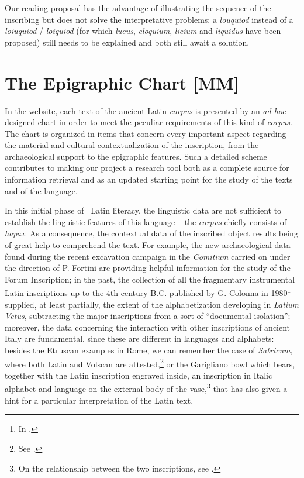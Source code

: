 \documentclass[amsthm,ebook]{saparticle}
\begin{document}
Our reading proposal has the advantage of illustrating the sequence of the inscribing but does not solve the
interpretative problems: a \emph{louquiod} instead of a \emph{loiuquiod} / \emph{loiquiod} (for which \emph{lucus}, \emph{eloquium}, \emph{licium} and \emph{liquidus}
have been proposed) still needs to be explained and both still await a solution. 

\section{The Epigraphic Chart [MM]}\label{sec:3chart}


\noindent In the website, each text of the ancient Latin \emph{corpus} is presented by an \emph{ad hoc} designed chart in order to meet the
peculiar requirements of this kind of \emph{corpus}. The chart is organized in items that concern every important aspect
regarding the material and cultural contextualization of the inscription, from the archaeological support to the
epigraphic features. Such a detailed scheme contributes to making our project a research tool both as a complete source
for information retrieval and as an updated starting point for the study of the texts and of the language.

In this initial phase of \ Latin literacy, the linguistic data are not sufficient to establish the linguistic features
of this language – the \emph{corpus} chiefly consists of \emph{hapax}. As a consequence, the contextual data of the inscribed object
results being of great help to comprehend the text. For example, the new archaeological data found during the recent
excavation campaign in the \emph{Comitium} carried on under the direction of P. Fortini are providing helpful information for
the study of the Forum Inscription; in the past, the collection of all the fragmentary instrumental Latin inscriptions
up to the 4th century B.C. published by G. Colonna in 1980\footnote{In \citet{stibbe_lapis_1980}.} supplied, at least
partially, the extent of the alphabetization developing in \emph{Latium Vetus}, subtracting the major inscriptions from a sort
of ``documental isolation''; moreover, the data concerning the interaction with other inscriptions of ancient Italy are
fundamental, since these are different in languages and alphabets: besides the Etruscan examples in Rome, we can
remember the case of \emph{Satricum}, where both Latin and Volscan are attested,\footnote{See \citet[189-198]{rocca_i_1995}.} or the
Garigliano bowl which bears, together with the Latin inscription engraved inside, an inscription in Italic alphabet and
language on the external body of the vase,\footnote{On the relationship between the two inscriptions, see \citet{antonini_osservazioni_2012}.} that has also given a hint for a particular interpretation of the Latin text. 
\end{document}
